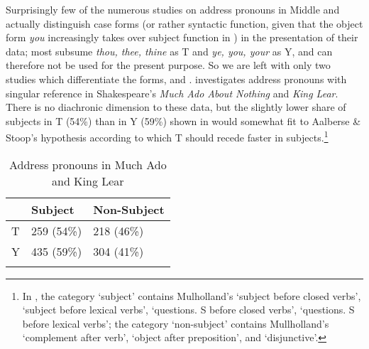 \documentclass[output=paper,hidelinks]{langscibook}
\begin{document}
Surprisingly few of the numerous studies on address pronouns in Middle and  actually distinguish case forms (or rather syntactic function, given that the object form \textit{you} increasingly takes over subject function in ) in the presentation of their data; most subsume \textit{thou, thee, thine} as T and \textit{ye, you, your} as Y, and can therefore not be used for the present purpose. So we are left with only two studies which differentiate the forms, \citet{Mulholland1967} and \citet{Walker2007}. \citet{Mulholland1967} investigates address pronouns with singular reference in Shakespeare’s \textit{Much Ado About Nothing} and \textit{King Lear}. There is no diachronic dimension to these data, but the slightly lower share of subjects in T (54\%) than in Y (59\%) shown in  would somewhat fit to Aalberse \& Stoop’s hypothesis according to which T should recede faster in subjects.\footnote{In , the category \enquote*{subject} contains Mulholland's \enquote*{subject before closed verbs}, \enquote*{subject before lexical verbs}, \enquote*{questions. S before closed verbs}, \enquote*{questions. S before lexical verbs}; the category \enquote*{non-subject} contains Mullholland's \enquote*{complement after verb}, \enquote*{object after preposition}, and \enquote*{disjunctive}.}  

\begin{table}
\caption{Address pronouns in Much Ado and King Lear \citep{Mulholland1967}}
\label{tab7elsweiler}
 \begin{tabularx}{.8\textwidth}{l YY}
  \lsptoprule
            & Subject & Non-Subject\\ 
  \midrule
  T  & 259 (54\%)  & 218 (46\%) \\
  Y  & 435 (59\%)  & 304 (41\%) \\
  \lspbottomrule
 \end{tabularx}
\end{table}
\end{document}

